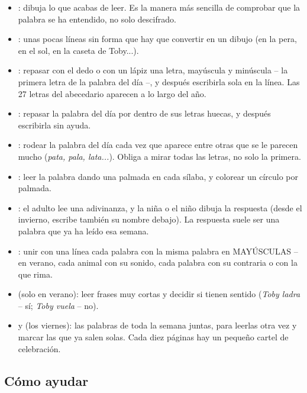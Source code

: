 {\small
\begin{itemize}[leftmargin=6mm, itemsep=1pt, topsep=2pt]
\item \textbf{\lblDibuja}: dibuja lo que acabas de leer. Es la manera
  más sencilla de comprobar que la palabra se ha entendido, no solo
  descifrado.
\item \textbf{\lblCompleta}: unas pocas líneas sin forma que hay que
  convertir en un dibujo (en la pera, en el sol, en la caseta de
  Toby...).
\item \textbf{\lblTraza}: repasar con el dedo o con un lápiz una letra,
  mayúscula y minúscula -- la primera letra de la palabra del día --,
  y después escribirla sola en la línea. Las 27 letras del abecedario
  aparecen a lo largo del año.
\item \textbf{\lblEscribe}: repasar la palabra del día por dentro de
  sus letras huecas, y después escribirla sin ayuda.
\item \textbf{\lblEncuentra}: rodear la palabra del día cada vez que
  aparece entre otras que se le parecen mucho (\emph{pata, pala,
  lata...}). Obliga a mirar todas las letras, no solo la primera.
\item \textbf{\lblPalmadas}: leer la palabra dando una palmada en cada
  sílaba, y colorear un círculo por palmada.
\item \textbf{\lblAdivina}: el adulto lee una adivinanza, y la niña o
  el niño dibuja la respuesta (desde el invierno, escribe también su
  nombre debajo). La respuesta suele ser una palabra que ya ha leído
  esa semana.
\item \textbf{\lblUne}: unir con una línea cada palabra con la misma
  palabra en MAYÚSCULAS -- en verano, cada animal con su sonido, cada
  palabra con su contraria o con la que rima.
\item \textbf{\lblSiNo} (solo en verano): leer frases muy cortas y
  decidir si tienen sentido (\emph{Toby ladra} -- sí; \emph{Toby
  vuela} -- no).
\item \textbf{\lblRelee} y \textbf{\lblRepasa} (los viernes): las
  palabras de toda la semana juntas, para leerlas otra vez y marcar las
  que ya salen solas. Cada diez páginas hay un pequeño cartel de
  celebración.
\end{itemize}}

\subsection*{Cómo ayudar}

